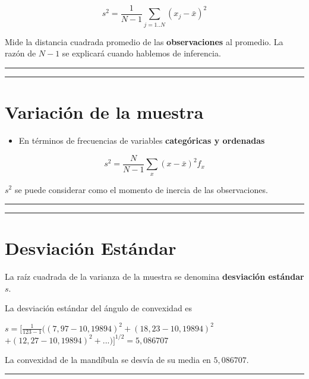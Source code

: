 \documentclass[
]{book}
\providecommand{\tightlist}{%
  \setlength{\itemsep}{0pt}\setlength{\parskip}{0pt}}
\begin{document}
\[s^2=\frac{1}{N-1} \sum_{j=1..N} (x_j-\bar{x})^2\]

Mide la distancia cuadrada promedio de las \textbf{observaciones} al promedio. La razón de \(N-1\) se explicará cuando hablemos de inferencia.

\begin{center}\rule{0.5\linewidth}{0.5pt}\end{center}

\begin{center}\rule{0.5\linewidth}{0.5pt}\end{center}

\hypertarget{variaciuxf3n-de-la-muestra-1}{%
\section{Variación de la muestra}\label{variaciuxf3n-de-la-muestra-1}}

\begin{itemize}
\tightlist
\item
  En términos de frecuencias de variables \textbf{categóricas y ordenadas}
\end{itemize}

\[s^2=\frac{N}{N-1} \sum_{x} (x-\bar{x})^2 f_x\]

\(s^2\) se puede considerar como el momento de inercia de las observaciones.

\begin{center}\rule{0.5\linewidth}{0.5pt}\end{center}

\begin{center}\rule{0.5\linewidth}{0.5pt}\end{center}

\hypertarget{desviaciuxf3n-estuxe1ndar}{%
\section{Desviación Estándar}\label{desviaciuxf3n-estuxe1ndar}}

La raíz cuadrada de la varianza de la muestra se denomina \textbf{desviación estándar} \(s\).

La desviación estándar del ángulo de convexidad es

\(s= [\frac{1}{123-1}((7,97-10,19894)^2+ (18,23-10,19894)^2\)
\(+ (12,27-10,19894)^2 + ...)]^{1/2} = 5,086707\)

La convexidad de la mandíbula se desvía de su media en \(5,086707\).

\begin{center}\rule{0.5\linewidth}{0.5pt}\end{center}
\end{document}
